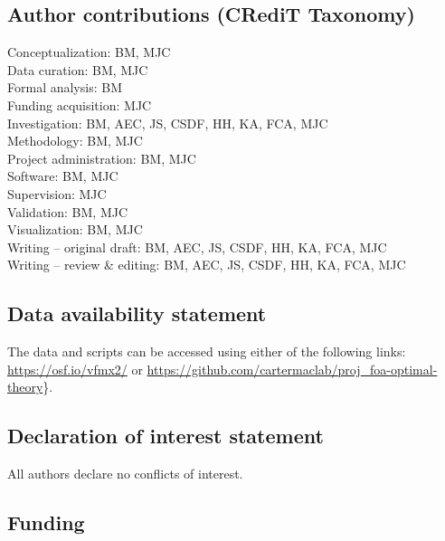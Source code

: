 \documentclass[
  11pt,
  doc, donotrepeattitle,floatsintext]{apa7}
\begin{document}
\newpage

\hypertarget{author-contributions-credit-taxonomy}{%
\subsection{Author contributions (CRediT Taxonomy)}\label{author-contributions-credit-taxonomy}}

\noindent Conceptualization: BM, MJC\\
\noindent Data curation: BM, MJC\\
\noindent Formal analysis: BM\\
\noindent Funding acquisition: MJC\\
\noindent Investigation: BM, AEC, JS, CSDF, HH, KA, FCA, MJC\\
\noindent Methodology: BM, MJC\\
\noindent Project administration: BM, MJC\\
\noindent Software: BM, MJC\\
\noindent Supervision: MJC\\
\noindent Validation: BM, MJC\\
\noindent Visualization: BM, MJC\\
\noindent Writing -- original draft: BM, AEC, JS, CSDF, HH, KA, FCA, MJC\\
\noindent Writing -- review \& editing: BM, AEC, JS, CSDF, HH, KA, FCA, MJC

\hypertarget{data-availability-statement}{%
\subsection{Data availability statement}\label{data-availability-statement}}

\noindent The data and scripts can be accessed using either of the following links: \url{https://osf.io/vfmx2/} or \url{https://github.com/cartermaclab/proj_foa-optimal-theory}\}.

\hypertarget{declaration-of-interest-statement}{%
\subsection{Declaration of interest statement}\label{declaration-of-interest-statement}}

\noindent All authors declare no conflicts of interest.

\hypertarget{funding}{%
\subsection{Funding}\label{funding}}
\end{document}
